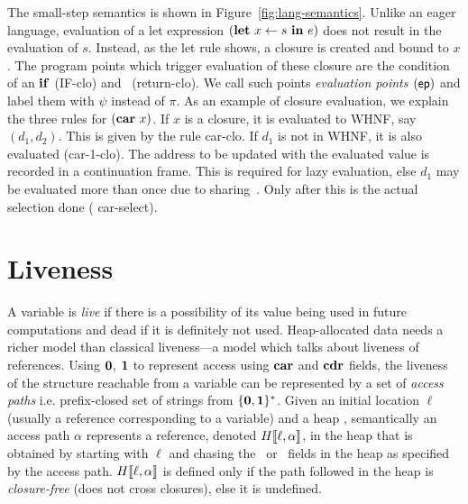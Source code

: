 \documentclass[preprint, 9pt]{sigplanconf}
\newcommand{\comment}[1]{{\color{Myblue}{#1}}}
\begin{document}
The small-step semantics  is shown in Figure~\ref{fig:lang-semantics}.
Unlike   an   eager  language,   evaluation   of   a  let   expression
$(\mbox{$\mathbf{ let}$}~x\leftarrow  s~\mbox{$\mathbf{ in}$}~e)$ does  not  result in  the evaluation  of
$s$. Instead,  as the {\sc let}  rule shows, a closure  is created and
bound to  $x$. The  program points which  trigger evaluation  of these
closure   are  the   condition  of   an  $\mbox{$\mathbf{ if}$}$   ({\sc  IF-clo})   and
\SRETURN\ ({\sc  return-clo}).  We  call such  points \emph{evaluation
  points   $(\mathsf{ep})$}  and   label  them   with  $\psi$   instead  of
$\pi$. As an  example of closure  evaluation, we  explain the
three rules for  $(\mbox{$\mathbf{car}$}~x)$.  If $x$ is a closure,  it is evaluated to
WHNF, say $(d_1, d_2)$.  This is  given by the rule {\sc car-clo}.  If
$d_1$ is  not in WHNF,  it is  also evaluated ({\sc  car-1-clo}).  The
address  to be  updated  with the  evaluated value  is
recorded  in  a  continuation  frame.    This  is  required  for  lazy
evaluation, else $d_1$ may  be evaluated more than once
due to  sharing~\cite{Jones87}.  Only after this  is the actual selection  done ({\sc
  car-select}).


\renewcommand{\pp}[2]{\ensuremath{#1\!\!:\!#2}} %



\section{Liveness}
\label{sec:liveness}

A variable is {\em live} if there  is a possibility of its value being
used in  future computations and  dead if  it is definitely  not used.
Heap-allocated data  needs a richer model  than classical liveness---a
model  which  talks  about  liveness of  references.   Using  $\mathbf{0}$,
$\mathbf{1}$  to  represent access  using  $\mbox{$\mathbf{car}$}$  and $\mbox{$\mathbf{cdr}$}$  fields,  the
liveness of the structure reachable from a variable can be represented
by a set of {\em access paths} i.e.  prefix-closed set of strings from
$\{\mathbf{0},\mathbf{1}\}^\ast$.  Given an initial location $\ell$ (usually a 
reference corresponding to a variable) and  a heap  \heap, semantically  an access  path
$\alpha$ represents  a reference, denoted $H\llbracket\ell,  \alpha\rrbracket$, in
the heap  that is  obtained by  starting with  $\ell$ and  chasing the
\CAR\ or  \CDR\ fields in the heap as specified  by the  access path.  
$H\llbracket\ell, \alpha\rrbracket$  is defined only  if the path followed  in the
heap  is \emph{closure-free}  (does not  cross closures),  else it  is
undefined.
\end{document}
